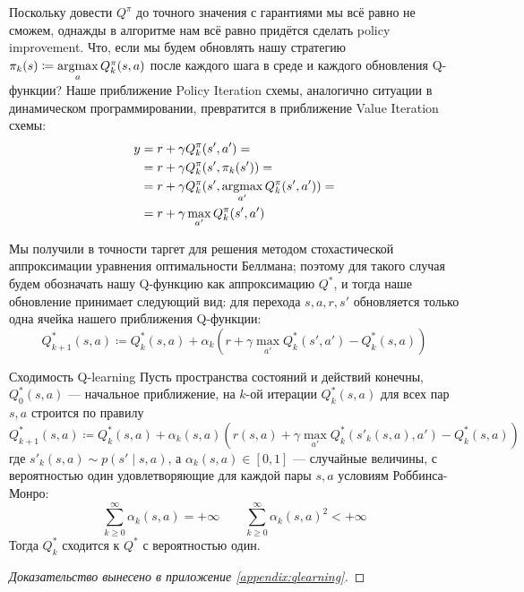 Поскольку довести $Q^{\pi}$ до точного значения с гарантиями мы всё равно не сможем, однажды в алгоритме нам всё равно придётся сделать policy improvement. Что, если мы будем обновлять нашу стратегию $\pi_k(s) \HM\coloneqq \argmax\limits_a Q^{\pi}_k(s, a)$ после каждого шага в среде и каждого обновления Q-функции? Наше приближение Policy Iteration схемы, аналогично ситуации в динамическом программировании, превратится в приближение Value Iteration схемы:
\begin{align*}
y &= r + \gamma Q^{\pi}_k(s', a') = \\
&= r + \gamma Q^{\pi}_k(s', \pi_k(s')) = \\
&= r + \gamma Q^{\pi}_k(s', \mathop{\mathrm{argmax}}_{a'} Q^{\pi}_k(s', a')) = \\
&= r + \gamma \max_{a'} Q^{\pi}_k(s', a')
\end{align*}

Мы получили в точности таргет для решения методом стохастической аппроксимации уравнения оптимальности Беллмана; поэтому для такого случая будем обозначать нашу Q-функцию как аппроксимацию $Q^*$, и тогда наше обновление принимает следующий вид: для перехода $s, a, r, s'$ обновляется только одна ячейка нашего приближения Q-функции:
\begin{equation}\label{Qlearningupdate}
Q^*_{k+1}(s, a) \coloneqq Q^{*}_k(s, a) + \alpha_k \left( r + \gamma \max_{a'} Q^{*}_k(s', a') - 
Q^{*}_k(s, a) \right) 
\end{equation}

\begin{theoremBox}[label=th:TDconvergencetheorem]{Сходимость Q-learning}
Пусть пространства состояний и действий конечны, $Q^*_0(s, a)$ --- начальное приближение, на $k$-ой итерации $Q^*_k(s, a)$ для всех пар $s, a$ строится по правилу
$$Q^*_{k+1}(s, a) \coloneqq Q^*_k(s, a) + \alpha_k(s, a) \left( r(s, a) + \gamma \max_{a'} Q^*_k(s'_k(s, a), a') - Q^*_k(s, a)\right)$$
где $s'_k(s, a) \sim p(s' \mid s, a)$, а $\alpha_k(s, a) \in [0, 1]$ --- случайные величины, с вероятностью один удовлетворяющие для каждой пары $s, a$ условиям Роббинса-Монро:
\begin{equation}\label{TDconvergence}
\sum_{k \ge 0}^{\infty} \alpha_k(s, a) = +\infty \qquad \sum_{k \ge 0}^{\infty} \alpha_k(s, a)^2 < +\infty
\end{equation}
Тогда $Q^*_k$ сходится к $Q^*$ с вероятностью один.
\begin{proof}[Доказательство вынесено в приложение \ref{appendix:qlearning}]
\end{proof}
\end{theoremBox}

